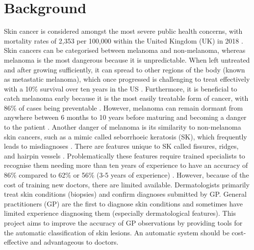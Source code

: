 

\cleardoublepage
\chapter{Background}

Skin cancer is considered amongst the most severe public health concerns, with mortality rates of 2,353 per 100,000 within the United Kingdom (UK) in 2018 \cite{UK2019}. Skin cancers can be categorised between melanoma and non-melanoma, whereas melanoma is the most dangerous because it is unpredictable. When left untreated and after growing sufficiently, it can spread to other regions of the body (known as metastatic melanoma), which once progressed is challenging to treat effectively with a 10\% survival over ten years in the US \cite{bhatia2009}. Furthermore, it is beneficial to catch melanoma early because it is the most easily treatable form of cancer, with 86\% of cases being preventable \cite{UK2019}. However, melanoma can remain dormant from anywhere between 6 months to 10 years before maturing and becoming a danger to the patient \cite{UK2019}. Another danger of melanoma is its similarity to non-melanoma skin cancers, such as a mimic called seborrhoeic keratosis (SK), which frequently leads to misdiagnoses \cite{Izikson2002}. There are features unique to SK called fissures, ridges, and hairpin vessels \cite{Minagawa2017}. Problematically these features require trained specialists to recognise them needing more than ten years of experience to have an accuracy of 86\% compared to 62\% or 56\% (3-5 years of experience) \cite{Morton1998}. However, because of the cost of training new doctors, there are limited available. Dermatologists primarily treat skin conditions (biopsies) and confirm diagnoses submitted by GP. General practitioners (GP) are the first to diagnose skin conditions and sometimes have limited experience diagnosing them (especially dermatological features). This project aims to improve the accuracy of GP observations by providing tools for the automatic classification of skin lesions. An automatic system should be cost-effective and advantageous to doctors.

